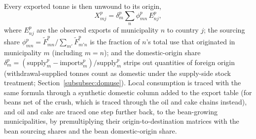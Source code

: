 Every exported tonne is then unwound to its origin,
\begin{equation}\label{eq:src2exp}
  X^p_{mj}=\delta^p_m\sum_{n}\phi^p_{mn}\,E^p_{nj},
\end{equation}
where $E^p_{nj}$ are the observed exports of municipality $n$ to country
$j$; the sourcing share
$\phi^p_{mn}=\tilde F^p_{mn}/\sum_{m'}\tilde F^p_{m'n}$ is the fraction
of $n$'s total use that originated in municipality $m$ (including $m=n$);
and the domestic-origin share
$\delta^p_m=(\text{supply}^p_m-\text{imports}^p_m)/\text{supply}^p_m$
strips out quantities of foreign origin (withdrawal-supplied tonnes count as
domestic under the supply-side stock treatment;
Section~\ref{subsubsec:domuse}).
Local consumption is traced with the same formula through a synthetic
domestic column added to the export table (for beans net of the crush, which
is traced through the oil and cake chains instead), and oil and cake are
traced one step further back, to the bean-growing municipalities, by
premultiplying their origin-to-destination matrices with the bean sourcing
shares and the bean domestic-origin share.

